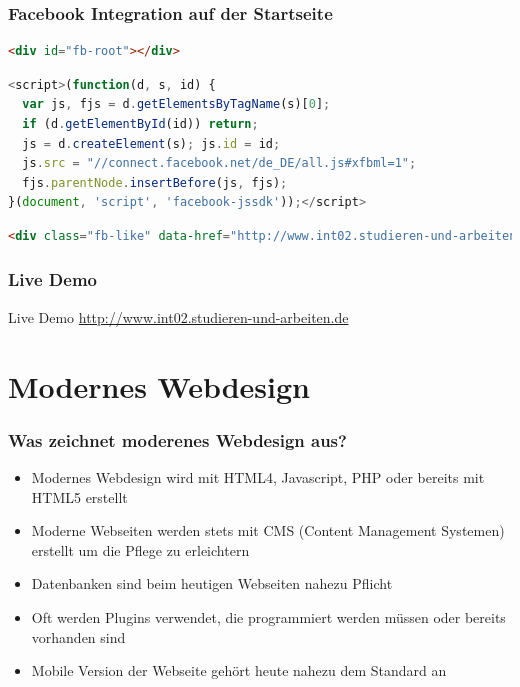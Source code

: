 \documentclass[xcolor=dvipsnames]{beamer}
\begin{document}
\begin{frame}[fragile]
  \frametitle{Facebook Integration auf der Startseite}

\begin{lstlisting}[language=HTML]
<div id="fb-root"></div>
\end{lstlisting}

\begin{lstlisting}[language=JavaScript, firstnumber=3]
<script>(function(d, s, id) {
  var js, fjs = d.getElementsByTagName(s)[0];
  if (d.getElementById(id)) return;
  js = d.createElement(s); js.id = id;
  js.src = "//connect.facebook.net/de_DE/all.js#xfbml=1";
  fjs.parentNode.insertBefore(js, fjs);
}(document, 'script', 'facebook-jssdk'));</script>
\end{lstlisting}

\begin{lstlisting}[language=HTML, firstnumber=26]
<div class="fb-like" data-href="http://www.int02.studieren-und-arbeiten.de/" data-send="false" data-width="450" data-show-faces="true"></div>
\end{lstlisting}

\end{frame}

\begin{frame} %
  \frametitle{Live Demo} %
  \begin{exampleblock}{Live Demo}
\url{http://www.int02.studieren-und-arbeiten.de}  \end{exampleblock}
\end{frame}

\section{Modernes Webdesign}
\begin{frame} %
  \frametitle{Was zeichnet moderenes Webdesign aus?} %
  \begin{block}{}
	\begin{itemize}
		\item Modernes Webdesign wird mit HTML4, Javascript, PHP oder bereits mit HTML5 erstellt
		\item Moderne Webseiten werden stets mit CMS (Content Management Systemen) erstellt um die Pflege zu erleichtern
		\item Datenbanken sind beim heutigen Webseiten nahezu Pflicht
		\item Oft werden Plugins verwendet, die programmiert werden müssen oder bereits vorhanden sind
		\item Mobile Version der Webseite gehört heute nahezu dem Standard an
	\end{itemize}
  \end{block}
\end{frame}
\end{document}
